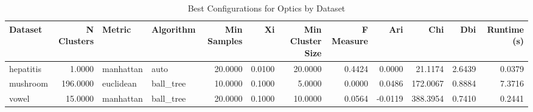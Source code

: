 \begin{table*}[ht!]
\caption{Best Configurations for Optics by Dataset}
\label{tab:best_configs_optics}
\begin{tabular}{lrllrrrrrrrr}
Dataset & N Clusters & Metric & Algorithm & Min Samples & Xi & Min Cluster Size & F Measure & Ari & Chi & Dbi & Runtime (s) \\\midrule

hepatitis & 1.0000 & manhattan & auto & 20.0000 & 0.0100 & 20.0000 & 0.4424 & 0.0000 & 21.1174 & 2.6439 & 0.0379 \\
mushroom & 196.0000 & euclidean & ball\_tree & 10.0000 & 0.1000 & 5.0000 & 0.0000 & 0.0486 & 172.0067 & 0.8884 & 7.3716 \\
vowel & 15.0000 & manhattan & ball\_tree & 20.0000 & 0.1000 & 10.0000 & 0.0564 & -0.0119 & 388.3954 & 0.7410 & 0.2441 \\
\end{tabular}
\end{table*}
